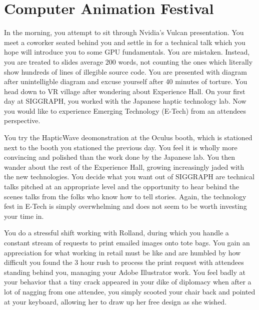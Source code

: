 \documentclass[../main.tex]{subfiles}
\begin{document}
\section{Computer Animation Festival}

In the morning, you attempt to sit through Nvidia's Vulcan presentation. You meet a coworker seated behind you and settle in for a technical talk which you hope will introduce you to some GPU fundamentals. You are mistaken. Instead, you are treated to slides average 200 words, not counting the ones which literally show hundreds of lines of illegible source code. You are presented with diagram after unintelligble diagram and excuse yourself after 40 minutes of torture. You head down to VR village after wondering about Experience Hall. On your first day at SIGGRAPH, you worked with the Japanese haptic technology lab. Now you would like to experience Emerging Technology (E-Tech) from an attendees perspective.

You try the HapticWave deomonstration at the Oculus booth, which is stationed next to the booth you stationed the previous day. You feel it is wholly more convincing and polished than the work done by the Japanese lab. You then wander about the rest of the Experience Hall, growing increasingly jaded with the new technologies. You decide what you want out of SIGGRAPH are technical talks pitched at an appropriate level and the opportunity to hear behind the scenes talks from the folks who know how to tell stories. Again, the technology fest in E-Tech is simply overwhelming and does not seem to be worth investing your time in.

You do a stressful shift working with Rolland, during which you handle a constant stream of requests to print emailed images onto tote bags. You gain an appreciation for what working in retail must be like and are humbled by how difficult you found the 3 hour rush to process the print request with attendees standing behind you, managing your Adobe Illustrator work. You feel badly at your behavior that a tiny crack appeared in your dike of diplomacy when after a lot of nagging from one attendee, you simply scooted your chair back and pointed at your keyboard, allowing her to draw up her free design as she wished.
\end{document}
